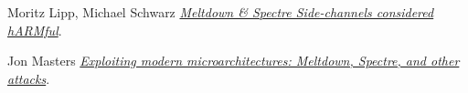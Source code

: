 \begin{frame}[allowframebreaks]
\begin{thebibliography}{10}
    Moritz Lipp, Michael Schwarz
    \newblock \href{https://mlq.me/download/qmss2018_slides.pdf}{\em Meltdown \& Spectre Side-channels considered hARMful}.

    Jon Masters
    \newblock \href{http://people.redhat.com/jcm/talks/FOSDEM_2018.pdf}{\em Exploiting modern microarchitectures: Meltdown,
      Spectre, and other attacks}.

  \end{thebibliography}
\end{frame}